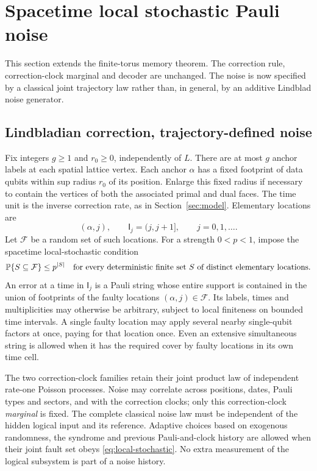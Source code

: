 \section{Spacetime local stochastic Pauli noise}\label{sec:correlated}

This section extends the finite-torus memory theorem. The correction
rule, correction-clock marginal and decoder are unchanged. The noise
is now specified by a classical joint trajectory law rather than,
in general, by an additive Lindblad noise generator.

\subsection{Lindbladian correction, trajectory-defined noise}

Fix integers \(g\ge1\) and \(r_0\ge0\), independently of \(L\).
There are at most \(g\) anchor labels at each spatial lattice
vertex. Each anchor \(\alpha\) has a fixed footprint of data qubits
within sup radius \(r_0\) of its position. Enlarge this fixed radius
if necessary to contain the vertices of both the associated primal
and dual faces. The time unit is the inverse correction rate, as
in Section~\ref{sec:model}. Elementary locations are
\[
 (\alpha,j),\qquad \mathsf I_j=(j,j+1],\qquad j=0,1,\ldots .
\]
Let \(\mathcal F\) be a random set of such locations. For a strength
\(0<p<1\), impose the spacetime local-stochastic condition
\begin{equation}\label{eq:local-stochastic}
 \mathbb P\{S\subseteq\mathcal F\}\le p^{|S|}
 \quad\text{for every deterministic finite set }S
             \text{ of distinct elementary locations}.
\end{equation}
An error at a time in \(\mathsf I_j\) is a Pauli string whose entire support
is contained in the union of footprints of the faulty locations
\((\alpha,j)\in\mathcal F\). Its labels, times and multiplicities
may otherwise be arbitrary, subject to local finiteness on bounded
time intervals. A single faulty location may apply several nearby
single-qubit factors at once, paying for that location once.
Even an extensive simultaneous string is allowed when it has the
required cover by faulty locations in its own time cell.

The two correction-clock families retain their joint product law
of independent rate-one Poisson processes. Noise may correlate
across positions, dates, Pauli types and sectors, and with the
correction clocks; only this correction-clock \emph{marginal} is
fixed. The complete classical noise law must be independent of
the hidden logical input and its reference. Adaptive choices based
on exogenous randomness, the syndrome and previous Pauli-and-clock
history are allowed when their joint fault set obeys
\eqref{eq:local-stochastic}. No extra measurement of the logical
subsystem is part of a noise history.

